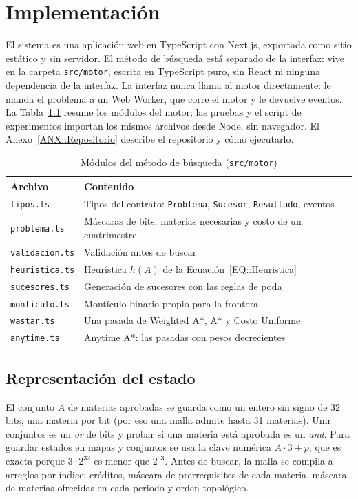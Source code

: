 \chapter{Implementación}
El sistema es una aplicación web en TypeScript con Next.js, exportada como sitio estático y sin servidor. El método de búsqueda está separado de la interfaz: vive en la carpeta \texttt{src/motor}, escrita en TypeScript puro, sin React ni ninguna dependencia de la interfaz. La interfaz nunca llama al motor directamente: le manda el problema a un Web Worker, que corre el motor y le devuelve eventos. La Tabla~\ref{TAB::Modulos} resume los módulos del motor; las pruebas y el script de experimentos importan los mismos archivos desde Node, sin navegador. El Anexo~\ref{ANX::Repositorio} describe el repositorio y cómo ejecutarlo.

\begin{table}[H]
  \begin{center}
    \caption{Módulos del método de búsqueda (\texttt{src/motor})}
    \label{TAB::Modulos}
    \begin{tabular}{|| l | p{10cm} ||}
        \hline
        Archivo & Contenido \\ [0.5ex]
        \hline\hline
        \texttt{tipos.ts} & Tipos del contrato: \texttt{Problema}, \texttt{Sucesor}, \texttt{Resultado}, eventos \\
        \hline
        \texttt{problema.ts} & Máscaras de bits, materias necesarias y costo de un cuatrimestre \\
        \hline
        \texttt{validacion.ts} & Validación antes de buscar \\
        \hline
        \texttt{heuristica.ts} & Heurística $h(A)$ de la Ecuación~\eqref{EQ::Heuristica} \\
        \hline
        \texttt{sucesores.ts} & Generación de sucesores con las reglas de poda \\
        \hline
        \texttt{monticulo.ts} & Montículo binario propio para la frontera \\
        \hline
        \texttt{wastar.ts} & Una pasada de Weighted A*, A* y Costo Uniforme \\
        \hline
        \texttt{anytime.ts} & Anytime A*: las pasadas con pesos decrecientes \\
        \hline
    \end{tabular}
  \end{center}
\end{table}

\section{Representación del estado}
El conjunto $A$ de materias aprobadas se guarda como un entero sin signo de 32 bits, una materia por bit (por eso una malla admite hasta 31 materias). Unir conjuntos es un \emph{or} de bits y probar si una materia está aprobada es un \emph{and}. Para guardar estados en mapas y conjuntos se usa la clave numérica $A \cdot 3 + p$, que es exacta porque $3 \cdot 2^{32}$ es menor que $2^{53}$. Antes de buscar, la malla se compila a arreglos por índice: créditos, máscara de prerrequisitos de cada materia, máscara de materias ofrecidas en cada periodo y orden topológico.

